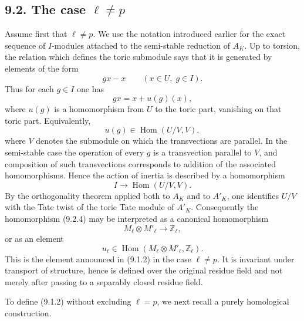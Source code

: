 \documentclass[11pt]{article}
\newcommand{\Hom}{\operatorname{Hom}}
\newcommand{\Z}{\mathbb Z}
\begin{document}
\subsection*{9.2. The case \(\ell\ne p\)}
Assume first that \(\ell\ne p\).  We use the notation introduced earlier for the exact sequence of \(I\)-modules attached to the semi-stable reduction of \(A_K\).  Up to torsion, the relation which defines the toric submodule says that it is generated by elements of the form
\begin{equation}\tag{9.2.1}
        gx-x\qquad (x\in U,\; g\in I).
\end{equation}
Thus for each \(g\in I\) one has
\begin{equation}\tag{9.2.2}
        gx=x+u(g)(x),
\end{equation}
where \(u(g)\) is a homomorphism from \(U\) to the toric part, vanishing on that toric part.  Equivalently,
\begin{equation}\tag{9.2.3}
        u(g)\in\Hom(U/V,V),
\end{equation}
where \(V\) denotes the submodule on which the transvections are parallel.  In the semi-stable case the operation of every \(g\) is a transvection parallel to \(V\), and composition of such transvections corresponds to addition of the associated homomorphisms.  Hence the action of inertia is described by a homomorphism
\begin{equation}\tag{9.2.4}
        I\longrightarrow \Hom(U/V,V).
\end{equation}
By the orthogonality theorem applied both to \(A_K\) and to \(A'_K\), one identifies \(U/V\) with the Tate twist of the toric Tate module of \(A'_K\).  Consequently the homomorphism (9.2.4) may be interpreted as a canonical homomorphism
\begin{equation}\tag{9.2.5}
        M_\ell\otimes M'_\ell\longrightarrow \Z_\ell,
\end{equation}
or as an element
\begin{equation}\tag{9.2.6}
        u_\ell\in\Hom(M_\ell\otimes M'_\ell,\Z_\ell).
\end{equation}
This is the element announced in (9.1.2) in the case \(\ell\ne p\).  It is invariant under transport of structure, hence is defined over the original residue field and not merely after passing to a separably closed residue field.

To define (9.1.2) without excluding \(\ell=p\), we next recall a purely homological construction.
\end{document}
